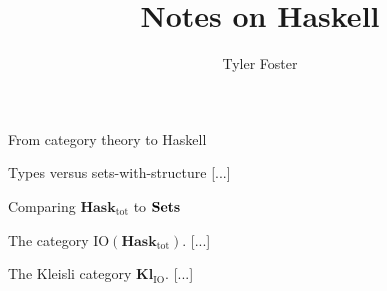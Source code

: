 \documentclass[11pt, a4paper]{article}
\begin{document}
\title{Notes on Haskell}

\author{Tyler Foster}

\maketitle

\begin{section}{From category theory to Haskell}

\begin{subsection}{Types versus sets-with-structure}
[...]
\end{subsection}

\begin{subsection}{Comparing $\mathbf{Hask}_\text{tot}$ to $\bold{Sets}$}
\end{subsection}

\begin{subsection}{The category $\text{IO}(\mathbf{Hask}_\text{tot})$.}
[...]
\end{subsection}

\begin{subsection}{The Kleisli category $\mathbf{Kl}_\text{IO}$.}
[...]
\end{subsection}

\end{section}

\cite{NeoRie}
\cite{Geo}
\cite{Cohn}




\end{document}
